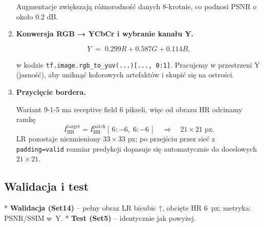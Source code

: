 \documentclass[11pt]{article}
\begin{document}
\begin{enumerate}


Augmentacje zwiększają różnorodność danych 8-krotnie, co podnosi PSNR
o około 0.2 dB.

\item \textbf{Konwersja RGB → YCbCr i wybranie kanału Y.}

\[
  Y \;=\; 0.299R + 0.587G + 0.114B,
\]

\noindent
w kodzie \texttt{tf.image.rgb\_to\_yuv(...)[...,\,0:1]}.
Pracujemy w przestrzeni Y (jasność), aby uniknąć kolorowych
artefaktów i skupić się na ostrości.

\item \textbf{Przycięcie bordera.}

Wariant 9-1-5 ma receptive field 6 pikseli,
więc od obrazu HR odcinamy ramkę
\[
  I_\mathrm{HR}^{\mathrm{target}} =
  I_\mathrm{HR}^{\mathrm{patch}}[\,6:-6,\;6:-6\,]
  \quad\Longrightarrow\quad 21\times21\;\text{px}.
\]
LR pozostaje niezmieniony \(33\times33\) px; po przejściu przez sieć z
\texttt{padding=valid} rozmiar predykcji dopasuje się automatycznie do
docelowych \(21\times21\).

\end{enumerate}



\subsection{Walidacja i test}

* \textbf{Walidacja (Set14)} – pełny obraz LR bicubic ↑, obcięte HR
\(6\)~px; metryka: PSNR/SSIM w~Y.
* \textbf{Test (Set5)} – identycznie jak powyżej.
\end{document}
